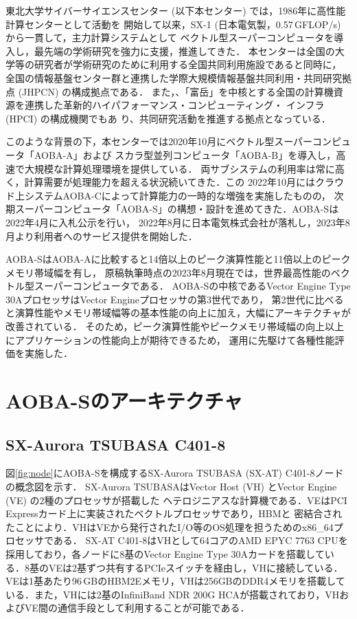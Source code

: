﻿\documentclass[submit,techrep,noauthor]{ipsj}
\begin{document}
東北大学サイバーサイエンスセンター (以下本センター) では，1986年に高性能計算センターとして活動を
開始して以来，SX-1 (日本電気製，0.57\,GFLOP/s) から一貫して，主力計算システムとして
ベクトル型スーパーコンピュータを導入し，最先端の学術研究を強力に支援，推進してきた．
本センターは全国の大学等の研究者が学術研究のために利用する全国共同利用施設であると同時に，
全国の情報基盤センター群と連携した学際大規模情報基盤共同利用・共同研究拠点 (JHPCN) の構成拠点である．
また，、「富岳」を中核とする全国の計算機資源を連携した革新的ハイパフォーマンス・コンピューティング・
インフラ (HPCI) の構成機関でもあ り、共同研究活動を推進する拠点となっている．

このような背景の下，本センターでは2020年10月にベクトル型スーパーコンピュータ「AOBA-A」および
スカラ型並列コンピュータ「AOBA-B」を導入し，高速で大規模な計算処理環境を提供している．
両サブシステムの利用率は常に高く，計算需要が処理能力を超える状況続いてきた．この
2022年10月にはクラウド上システムAOBA-Cによって計算能力の一時的な増強を実施したものの，
次期スーパーコンピュータ「AOBA-S」の構想・設計を進めてきた．AOBA-Sは2022年4月に入札公示を行い，
2022年8月に日本電気株式会社が落札し，2023年8月より利用者へのサービス提供を開始した．

AOBA-SはAOBA-Aに比較すると14倍以上のピーク演算性能と11倍以上のピークメモリ帯域幅を有し，
原稿執筆時点の2023年8月現在では，世界最高性能のベクトル型スーパーコンピュータである．
AOBA-Sの中核であるVector Engine Type 30AプロセッサはVector Engineプロセッサの第3世代であり，
第2世代に比べると演算性能やメモリ帯域幅等の基本性能の向上に加え，大幅にアーキテクチャが改善されている．
そのため，ピーク演算性能やピークメモリ帯域幅の向上以上にアプリケーションの性能向上が期待できるため，
運用に先駆けて各種性能評価を実施した．

\section{AOBA-Sのアーキテクチャ}

\subsection{SX-Aurora TSUBASA C401-8}

図\ref{fig:node}にAOBA-Sを構成するSX-Aurora TSUBASA (SX-AT) C401-8ノードの概念図を示す．
SX-Aurora TSUBASAはVector Host (VH) とVector Engine (VE) の2種のプロセッサが搭載した
ヘテロジニアスな計算機である．VEはPCI Expressカード上に実装されたベクトルプロセッサであり，HBMと
密結合されたことにより．VHはVEから発行されたI/O等のOS処理を担うためのx86\_64プロセッサである．
SX-AT C401-8はVHとして64コアのAMD EPYC 7763 CPUを採用しており，各ノードに8基のVector Engine Type
30Aカードを搭載している．8基のVEは2基ずつ共有するPCIeスイッチを経由し，VHに接続している．
VEは1基あたり96\,GBのHBM2Eメモリ，VHは256GBのDDR4メモリを搭載している．また，VHには2基のInfiniBand
NDR 200G HCAが搭載されており，VHおよびVE間の通信手段として利用することが可能である．
\end{document}
